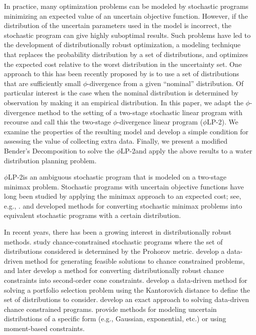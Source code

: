 \documentclass[ijoc,letterpaper]{informs3} %
\newcommand{\plp}{$\phi$LP-2}
\begin{document}
In practice, many optimization problems can be modeled by stochastic programs minimizing an expected value of an uncertain objective function.
However, if the distribution of the uncertain parameters used in the model is incorrect, the stochastic program can give highly suboptimal results.
Such problems have led to the development of distributionally robust optimization, a modeling technique that replaces the probability distribution by a set of distributions, and optimizes the expected cost relative to the worst distribution in the uncertainty set.
One approach to this has been recently proposed by \cite{bental2011robust} is to use a set of distributions that are sufficiently small $\phi$-divergence from a given ``nominal'' distribution.
Of particular interest is the case when the nominal distribution is determined by observation by making it an empirical distribution.
In this paper, we adapt the $\phi$-divergence method to the setting of a two-stage stochastic linear program with recourse and call this the two-stage $\phi$-divergence linear program (\plp). 
We examine the properties of the resulting model and develop a simple condition for assessing the value of collecting extra data.
Finally, we present a modified Bender's Decomposition to solve the \plp and apply the above results to a water distribution planning problem.

\plp is an ambiguous stochastic program that is modeled on a two-stage minimax problem.
Stochastic programs with uncertain objective functions have long been studied by applying the minimax approach to an expected cost; see, e.g., \cite{zackova1966minimax,dupacova_87}.
\cite{shapiro2002minimax} and \cite{shapiro2004class} developed methods for converting stochastic minimax problems into equivalent stochastic programs with a certain distribution.

In recent years, there has been a growing interest in distributionally robust methods.
\cite{erdogan2006ambiguous} study chance-constrained stochastic programs where the set of distributions considered is determined by the Prohorov metric.
\cite{calafiore2005uncertain} develop a data-driven method for generating feasible solutions to chance constrained problems, and later \cite{calafiore2006distributionally} develop a method for converting distributionally robust chance constraints into second-order cone constraints.
\cite{pflug2007ambiguity} develop a data-driven method for solving a portfolio selection problem using the Kantorovich distance to define the set of distributions to consider.
\cite{jiang2012data} develop an exact approach to solving data-driven chance constrained programs.
\cite{delage2010distributionally} provide methods for modeling uncertain distributions of a specific form (e.g., Gaussian, exponential, etc.) or using moment-based constraints.
\end{document}
